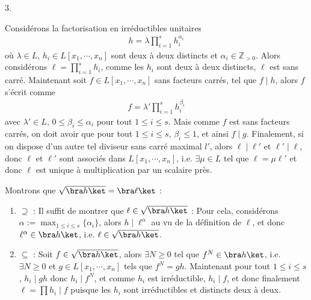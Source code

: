 \documentclass[11pt]{article}
\begin{document}
    \begin{question}{3.}
        \label{q3}
        \item Considérons la factorisation en irréductibles unitaires
        \begin{align}
            h = \lambda \prod_{i = 1}^s h_i^{\alpha_i}
        \end{align}
        où $\lambda \in L$, $h_i \in L[x_1, \cdots, x_n]$ sont deux à deux distincts et $\alpha_i \in \mathbb{Z}_{>0}$. Alors considérons $\ell = \prod_{i = 1}^s h_i$, comme les $h_i$ sont deux à deux distincts, $\ell$ est sans carré. Maintenant soit $f \in L[x_1, \cdots, x_n]$ sans facteurs carrés, tel que $f \mid h$, alors $f$ s'écrit comme
        \begin{align*}
            f = \lambda' \prod_{i = 1}^s h_i^{\beta_i}
        \end{align*}
        avec $\lambda' \in L$, $0 \leq \beta_i \leq \alpha_i$ pour tout $1 \leq i \leq s$. Mais comme $f$ est sans facteurs carrés, on doit avoir que pour tout $1 \leq i \leq s$, $\beta_i \leq 1$, et ainsi $f \mid g$. Finalement, si on dispose d'un autre tel diviseur sans carré maximal $l'$, alors $\ell  \mid \ell '$ et $\ell ' \mid \ell $, donc $\ell $ et $\ell '$ sont associés dans $L[x_1, \cdots, x_n]$, i.e. $\exists \mu \in L$ tel que $\ell  = \mu \ell '$ et donc $\ell $ est unique à multiplication par un scalaire près.
        \item Montrons que $\sqrt{\bra h \ket} = \bra \ell \ket$ :
        \begin{enumerate}
            \item $\supseteq$ : Il suffit de montrer que $\ell \in \sqrt{\bra h \ket}$ : Pour cela, considérons $\alpha := \max_{1 \leq i \leq s} \{\alpha_i\}$, alors $h \mid \ell^\alpha$ au vu de la définition de $\ell$, et donc $\ell^\alpha \in \bra h \ket$, i.e. $\ell \in \sqrt{\bra h \ket}$.
            \item $\subseteq$ : Soit $f \in \sqrt{\bra h \ket}$, alors $\exists N \geq 0$ tel que $f^N \in \bra h \ket$, i.e. $\exists N \geq 0$ et $g \in L[x_1, \cdots, x_n]$ tels que $f^N = gh$. Maintenant pour tout $1 \leq i \leq s$, $h_i \mid gh$ donc $h_i \mid f^N$, et comme $h_i$ est irréductible, $h_i \mid f$, et donc finalement $\ell = \prod h_i \mid f$ puisque les $h_i$ sont irréductibles et distincts deux à deux.
        \end{enumerate}
    \end{question}
\end{document}
